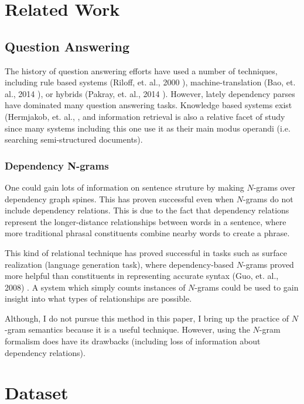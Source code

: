 \documentclass[twoside]{article}
\begin{document}
\section{Related Work}

\subsection{Question Answering}

The history of question answering efforts have used a number of techniques, including rule based systems (Riloff, et. al., 2000 \cite{ril00}), machine-translation (Bao, et. al., 2014 \cite{bao14}), or hybrids (Pakray, et. al., 2014 \cite{pak11}). However, lately dependency parses have dominated many question answering tasks.  Knowledge based systems exist (Hermjakob, et. al., \cite{her02}, and information retrieval is also a relative facet of study since many systems including this one use it as their main modus operandi (i.e. searching semi-structured documents).

\subsubsection{Dependency N-grams}

One could gain lots of information on sentence struture by making $N$-grams over dependency graph spines.  This has proven successful even when $N$-grams do not include dependency relations.  This is due to the fact that dependency relations represent the longer-distance relationships between words in a sentence, where more traditional phrasal constituents combine nearby words to create a phrase.

This kind of relational technique has proved successful in tasks such as surface realization (language generation task), where dependency-based $N$-grams proved more helpful than constituents in representing accurate syntax (Guo, et. al., 2008) \cite{guo08}.  A system which simply counts instances of $N$-grams could be used to gain insight into what types of relationships are possible.

Although, I do not pursue this method in this paper, I bring up the practice of $N$-gram semantics because it is a useful technique.  However, using the $N$-gram formalism does have its drawbacks (including loss of information about dependency relations).

\section{Dataset}
\end{document}
